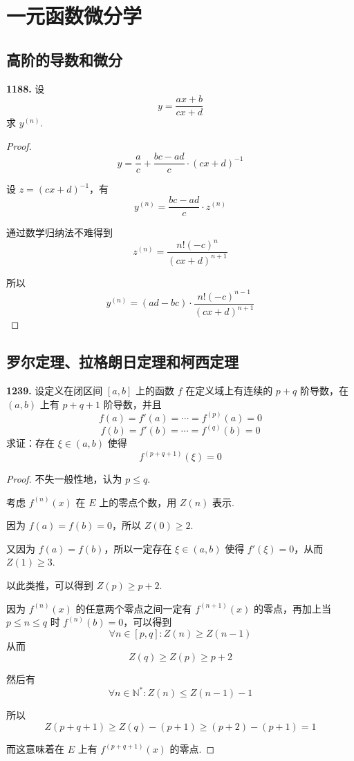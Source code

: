 \section{一元函数微分学}
\subsection{高阶的导数和微分}
\textbf{1188.} 设
\[y = \frac{ax + b}{cx + d}\]
求 $y^{(n)}$.

\begin{proof}
    \[y = \frac{a}{c} + \frac{bc - ad}{c} \cdot (cx + d)^{-1}\]

    设 $z = (cx + d)^{-1}$，有
    \[y^{(n)} = \frac{bc - ad}{c} \cdot z^{(n)}\]

    通过数学归纳法不难得到
    \[z^{(n)} = \frac{n!(-c)^n}{(cx + d)^{n+1}}\]

    所以
    \[y^{(n)} = (ad - bc) \cdot \frac{n! (-c)^{n-1}}{(cx + d)^{n+1}}\]
\end{proof}

\subsection{罗尔定理、拉格朗日定理和柯西定理}

\textbf{1239.} 设定义在闭区间 $[a,b]$ 上的函数 $f$ 在定义域上有连续的 $p+q$ 阶导数，在 $(a,b)$ 上有 $p + q + 1$ 阶导数，并且
\[f(a) = f'(a) = \cdots = f^{(p)}(a) = 0\]
\[f(b) = f'(b) = \cdots = f^{(q)}(b) = 0\]
求证：存在 $\xi \in (a,b)$ 使得
\[f^{(p + q + 1)}(\xi) = 0\]

\begin{proof}
    不失一般性地，认为 $p \leqslant q$.

    考虑 $f^{(n)}(x)$ 在 $E$ 上的零点个数，用 $Z(n)$ 表示.

    因为 $f(a) = f(b) = 0$，所以 $Z(0) \geqslant 2$.

    又因为 $f(a) = f(b)$，所以一定存在 $\xi \in (a,b)$ 使得 $f'(\xi) = 0$，从而 $Z(1) \geqslant 3$.

    以此类推，可以得到 $Z(p) \geqslant p + 2$.

    因为 $f^{(n)}(x)$ 的任意两个零点之间一定有 $f^{(n+1)}(x)$ 的零点，再加上当 $p \leqslant n \leqslant q$ 时 $f^{(n)}(b) = 0$，可以得到
    \[\forall n \in [p,q]: Z(n) \geqslant Z(n-1)\]
    从而
    \[Z(q) \geqslant Z(p) \geqslant p + 2\]

    然后有
    \[\forall n \in \mathbb{N}^*: Z(n) \leqslant Z(n-1) - 1\]

    所以
    \[Z(p+q+1) \geqslant Z(q) - (p + 1) \geqslant (p+2) - (p+1) = 1\]

    而这意味着在 $E$ 上有 $f^{(p+q+1)}(x)$ 的零点.
\end{proof}\vspace{9pt}

